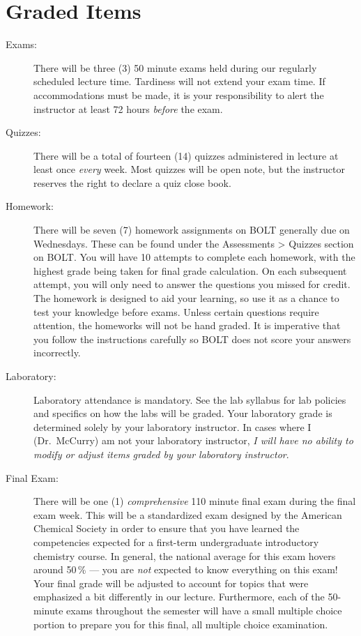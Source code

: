 \documentclass[11pt,letterpaper]{article}
\begin{document}
\section{Graded Items}
\begin{description}
	\item[Exams:] There will be three (3) 50 minute exams held during our
		regularly scheduled lecture time. Tardiness will not extend your
		exam time. If accommodations must be made, it is your
		responsibility to alert the instructor at least 72 hours
		\emph{before} the exam.
	\item[Quizzes:] There will be a total of fourteen (14) quizzes
		administered in lecture at least once \emph{every} week. Most
		quizzes will be open note, but the instructor reserves the right
		to declare a quiz close book.
	\item[Homework:] There will be seven (7) homework assignments on BOLT
		generally due on Wednesdays. These can be found under the
		Assessments > Quizzes section on BOLT. You will have 10 attempts
		to complete each homework, with the highest grade being taken
		for final grade calculation. On each subsequent attempt, you
		will only need to answer the questions you missed for credit.
		The homework is designed to aid your learning, so use it as a
		chance to test your knowledge before exams. Unless certain
		questions require attention, the homeworks will not be hand
		graded. It is imperative that you follow the instructions
		carefully so BOLT does not score your answers incorrectly.
	\item[Laboratory:] Laboratory attendance is mandatory. See the lab
		syllabus for lab policies and specifics on how the labs will be
		graded. Your laboratory grade is determined solely by your
		laboratory instructor. In cases where I (Dr.\ McCurry) am not
		your laboratory instructor, \emph{I will have no ability to
		modify or adjust items graded by your laboratory instructor}.
	\item[Final Exam:] There will be one (1) \emph{comprehensive} 110 minute
		final exam during the final exam week. This will be a
		standardized exam designed by the American Chemical Society in
		order to ensure that you have learned the competencies expected
		for a first-term undergraduate introductory chemistry course. In
		general, the national average for this exam hovers around
		50\,\% --- you are \emph{not} expected to know everything on
		this exam! Your final grade will be adjusted to account for
		topics that were emphasized a bit differently in our lecture.
		Furthermore, each of the 50-minute exams throughout the semester
		will have a small multiple choice portion to prepare you for
		this final, all multiple choice examination.
\end{description}
\end{document}
